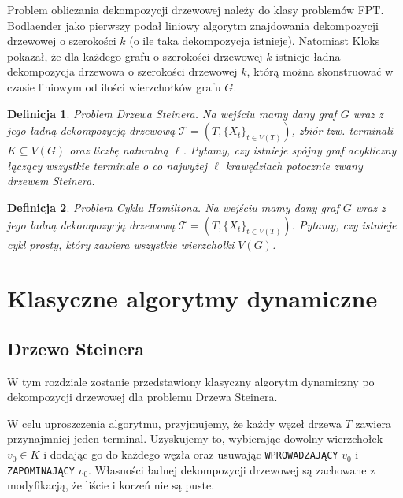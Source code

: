 \documentclass[12pt, oneside]{report}
\newtheorem{definition}{Definicja}
\begin{document}
Problem obliczania dekompozycji drzewowej należy do klasy problemów FPT. Bodlaender \cite{bodlaender} jako pierwszy podał liniowy algorytm znajdowania dekompozycji drzewowej o szerokości $k$ (o ile taka dekompozycja istnieje). Natomiast Kloks \cite{kloks} pokazał, że dla każdego grafu o szerokości drzewowej $k$ istnieje ładna dekompozycja drzewowa o szerokości drzewowej $k$, którą można skonstruować w czasie liniowym od ilości wierzchołków grafu $G$.

\begin{definition}
\em \emph{Problem Drzewa Steinera.} Na wejściu mamy dany graf $G$ wraz z jego ładną dekompozycją drzewową $\mathcal{T} = (T, \{X_t\}_{t \in V(T)})$, zbiór tzw. terminali $K \subseteq V(G)$ oraz liczbę naturalną $\ell$. Pytamy, czy istnieje spójny graf acykliczny łączący wszystkie terminale o co najwyżej $\ell$ krawędziach potocznie zwany drzewem Steinera.
\end{definition}

\begin{definition}
\em \emph{Problem Cyklu Hamiltona.} Na wejściu mamy dany graf $G$ wraz z jego ładną dekompozycją drzewową $\mathcal{T} = (T, \{X_t\}_{t \in V(T)})$. Pytamy, czy istnieje cykl prosty, który zawiera wszystkie wierzchołki $V(G)$.
\end{definition}

\newpage
  	\chapter{Klasyczne algorytmy dynamiczne}
    	\section{Drzewo Steinera}
    	
W tym rozdziale zostanie przedstawiony klasyczny algorytm dynamiczny po dekompozycji drzewowej dla problemu Drzewa Steinera.

W celu uproszczenia algorytmu, przyjmujemy, że każdy węzeł drzewa $T$ zawiera przynajmniej jeden terminal. Uzyskujemy to, wybierając dowolny wierzchołek $v_0 \in K$ i dodając go do każdego węzła oraz usuwając \texttt{WPROWADZAJĄCY} $v_0$ i \texttt{ZAPOMINAJĄCY} $v_0$. Własności ładnej dekompozycji drzewowej są zachowane z modyfikacją, że liście i korzeń nie są puste.
\end{document}
